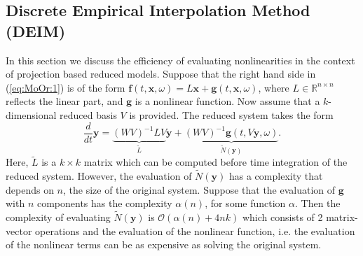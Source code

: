 \subsection{Discrete Empirical Interpolation Method (DEIM)} \label{chap:MoOr.DEIM:1} \nocite{Chaturantabut:2010cz}
In this section we {\edit discuss the efficiency} of evaluating nonlinearities {\edit in the context of} projection based reduced models. Suppose that the right hand side in (\ref{eq:MoOr:1}) is of the form $\mathbf f(t,\mathbf x , \omega) = L\mathbf x + \mathbf g(t,\mathbf x ,\omega)$, where $L\in \mathbb R^{n\times n}$ reflects the linear part, and $\mathbf g$ is a nonlinear function. Now {\edit assume that} a $k$-dimensional reduced basis $V$ is provided. The reduced system takes the form
\begin{equation} \label{eq:MoOr:8}
	\frac{d}{dt} \mathbf y = \underbrace{(WV)^{-1} L V}_{\tilde L} \mathbf{y} + \underbrace{(WV)^{-1} \mathbf g(t,V\mathbf y,\omega)}_{\tilde N (\mathbf y)}.
\end{equation}
Here, $\tilde L$ is a $k\times k$ matrix which can be computed before time integration of the reduced system. However, {\edit the} evaluation of $\tilde N (\mathbf y)$ has a complexity that depends on $n$, the size of the original system. Suppose that the evaluation of $\mathbf g$ with $n$ components has the complexity $\alpha(n)$, for some function $\alpha$. Then the complexity of evaluating $\tilde N(\mathbf y)$ is $\mathcal{O}(\alpha(n) + 4nk)$ which consists of 2 matrix-vector operations and the {\edit evaluation of the nonlinear function, i.e. the evaluation of the nonlinear terms can be as expensive as solving the original system.}

